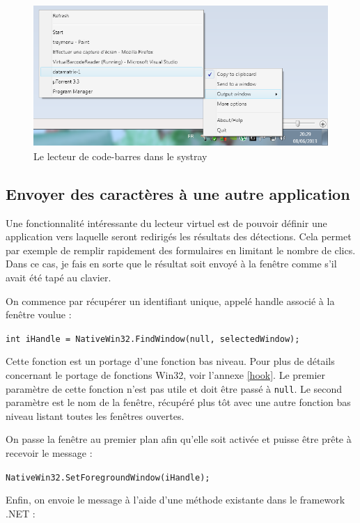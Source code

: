 \begin{figure}
\begin{center}
\includegraphics[scale=0.7]{images/traymenu.png}
\end{center}
\caption{Le lecteur de code-barres dans le systray}
\label{systrayMenu}
\end{figure}

\subsection{Envoyer des caractères à une autre application}

Une fonctionnalité intéressante du lecteur virtuel est de pouvoir définir une application vers laquelle seront redirigés les résultats des détections. Cela permet par exemple de remplir rapidement des formulaires en limitant le nombre de clics. Dans ce cas, je fais en sorte que le résultat soit envoyé à la fenêtre comme s'il avait été tapé au clavier.

On commence par récupérer un identifiant unique, appelé \og handle \fg{} associé à la fenêtre voulue :

\verb|int iHandle = NativeWin32.FindWindow(null, selectedWindow);|

Cette fonction est un portage d'une fonction bas niveau. Pour plus de détails concernant le portage de fonctions Win32, voir l'annexe \ref{hook}. Le premier paramètre de cette fonction n'est pas utile et doit être passé à \verb|null|. Le second paramètre est le nom de la fenêtre, récupéré plus tôt avec une autre fonction bas niveau listant toutes les fenêtres ouvertes.

On passe la fenêtre au premier plan afin qu'elle soit activée et puisse être prête à recevoir le message :

\verb|NativeWin32.SetForegroundWindow(iHandle);|

Enfin, on envoie le message à l'aide d'une méthode existante dans le framework .NET :

